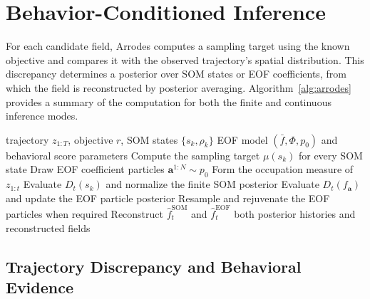 \documentclass[letterpaper,10pt,conference]{ieeeconf}
\begin{document}
\section{Behavior-Conditioned Inference}

For each candidate field, Arrodes computes a sampling target using the known objective and compares it with the observed trajectory's spatial distribution. This discrepancy determines a posterior over SOM states or EOF coefficients, from which the field is reconstructed by posterior averaging. Algorithm~\ref{alg:arrodes} provides a summary of the computation for both the finite and continuous inference modes.

\begin{algorithm}[H]
\caption{Arrodes environmental belief inference}
\label{alg:arrodes}
\footnotesize
\begin{algorithmic}[1]
\Require trajectory $z_{1:T}$, objective $r$, SOM states $\{s_k,\rho_k\}$
\Require EOF model $(\bar f,\Phi,p_0)$ and behavioral score parameters
\State Compute the sampling target $\mu(s_k)$ for every SOM state
\State Draw EOF coefficient particles $\boldsymbol a^{1:N}\sim p_0$
  \State Form the occupation measure of $z_{1:t}$
  \State Evaluate $D_t(s_k)$ and normalize the finite SOM posterior
  \State Evaluate $D_t(f_{\boldsymbol a})$ and update the EOF particle posterior
  \State Resample and rejuvenate the EOF particles when required
  \State Reconstruct $\widehat f_t^{\mathrm{SOM}}$ and $\widehat f_t^{\mathrm{EOF}}$
\EndFor
\State \Return both posterior histories and reconstructed fields
\end{algorithmic}
\end{algorithm}

\subsection{Trajectory Discrepancy and Behavioral Evidence}
\end{document}
